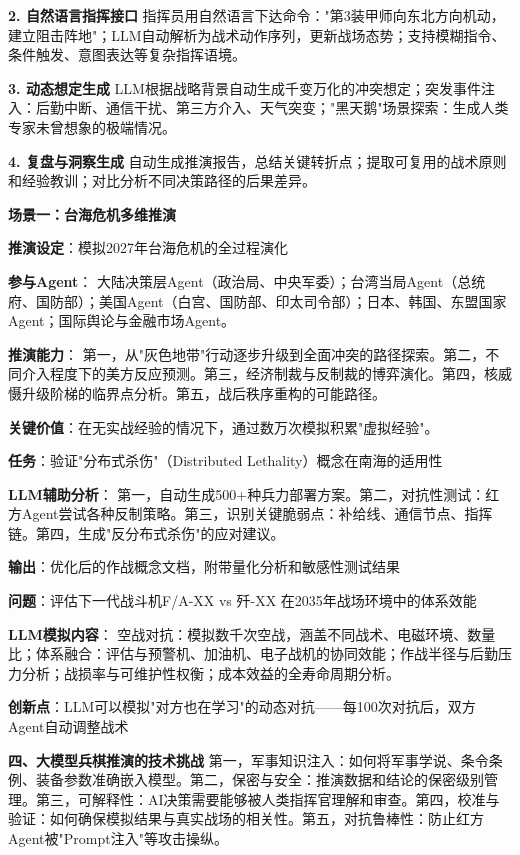\textbf{2. 自然语言指挥接口}
指挥员用自然语言下达命令："第3装甲师向东北方向机动，建立阻击阵地"；LLM自动解析为战术动作序列，更新战场态势；支持模糊指令、条件触发、意图表达等复杂指挥语境。

\textbf{3. 动态想定生成}
LLM根据战略背景自动生成千变万化的冲突想定；突发事件注入：后勤中断、通信干扰、第三方介入、天气突变；"黑天鹅"场景探索：生成人类专家未曾想象的极端情况。

\textbf{4. 复盘与洞察生成}
自动生成推演报告，总结关键转折点；提取可复用的战术原则和经验教训；对比分析不同决策路径的后果差异。

\textbf{场景一：台海危机多维推演}

\textbf{推演设定}：模拟2027年台海危机的全过程演化

\textbf{参与Agent}：
大陆决策层Agent（政治局、中央军委）；台湾当局Agent（总统府、国防部）；美国Agent（白宫、国防部、印太司令部）；日本、韩国、东盟国家Agent；国际舆论与金融市场Agent。

\textbf{推演能力}：
第一，从"灰色地带"行动逐步升级到全面冲突的路径探索。第二，不同介入程度下的美方反应预测。第三，经济制裁与反制裁的博弈演化。第四，核威慑升级阶梯的临界点分析。第五，战后秩序重构的可能路径。

\textbf{关键价值}：在无实战经验的情况下，通过数万次模拟积累"虚拟经验"。

\textbf{任务}：验证"分布式杀伤"（Distributed Lethality）概念在南海的适用性

\textbf{LLM辅助分析}：
第一，自动生成500+种兵力部署方案。第二，对抗性测试：红方Agent尝试各种反制策略。第三，识别关键脆弱点：补给线、通信节点、指挥链。第四，生成"反分布式杀伤"的应对建议。

\textbf{输出}：优化后的作战概念文档，附带量化分析和敏感性测试结果

\textbf{问题}：评估下一代战斗机F/A-XX vs 歼-XX 在2035年战场环境中的体系效能

\textbf{LLM模拟内容}：
空战对抗：模拟数千次空战，涵盖不同战术、电磁环境、数量比；体系融合：评估与预警机、加油机、电子战机的协同效能；作战半径与后勤压力分析；战损率与可维护性权衡；成本效益的全寿命周期分析。

\textbf{创新点}：LLM可以模拟"对方也在学习"的动态对抗——每100次对抗后，双方Agent自动调整战术

\textbf{四、大模型兵棋推演的技术挑战}
第一，军事知识注入：如何将军事学说、条令条例、装备参数准确嵌入模型。第二，保密与安全：推演数据和结论的保密级别管理。第三，可解释性：AI决策需要能够被人类指挥官理解和审查。第四，校准与验证：如何确保模拟结果与真实战场的相关性。第五，对抗鲁棒性：防止红方Agent被"Prompt注入"等攻击操纵。

